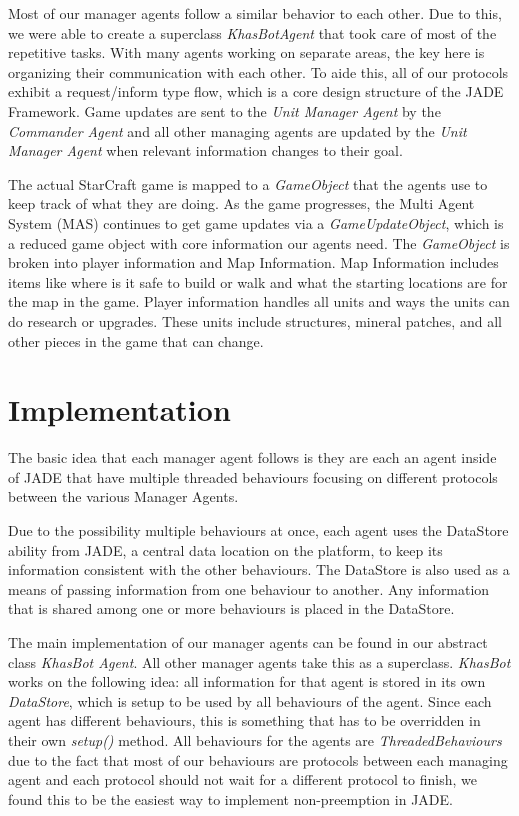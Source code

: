\documentclass[letterpaper]{article}
\begin{document}
Most of our manager agents follow a similar behavior to each other. Due to this, we were able to create a superclass \emph{KhasBotAgent} that took care of most of the repetitive tasks.  With many agents working on separate areas, the key here is organizing their communication with each other.  To aide this, all of our protocols exhibit a request/inform type flow, which is a core design structure of the JADE Framework.  Game updates are sent to the \emph{Unit Manager Agent} by the \emph{Commander Agent} and all other managing agents are updated by the \emph{Unit Manager Agent} when relevant information changes to their goal.

The actual StarCraft game is mapped to a \emph{GameObject} that the agents use to keep track of what they are doing.  As the game progresses, the Multi Agent System (MAS) continues to get game updates via a \emph{GameUpdateObject}, which is a reduced game object with core information our agents need.  The \emph{GameObject} is broken into player information and Map Information. Map Information includes items like where is it safe to build or walk and what the starting locations are for the map in the game.  Player information handles all units and ways the units can do research or upgrades.  These units include structures, mineral patches, and all other pieces in the game that can change.

\section{Implementation}
The basic idea that each manager agent follows is they are each an agent inside of JADE that have multiple threaded 
behaviours focusing on different protocols between the various Manager Agents.

Due to the possibility multiple behaviours at once, each agent uses the DataStore ability from JADE, a central 
data location on the platform, to keep its information consistent with the other behaviours. The DataStore is also
used as a means of passing information from one behaviour to another. Any information that is shared among one or
more behaviours is placed in the DataStore.

The main implementation of our manager agents can be found in our abstract class \emph{KhasBot Agent}. All other 
manager agents take this as a superclass. \emph{KhasBot} works on the following idea: all information for that agent 
is stored in its own \emph{DataStore}, which is setup to be used by all behaviours of the agent. Since each agent 
has different behaviours, this is something that has to be overridden in their own \emph{setup()} method. All 
behaviours for the agents are \emph{ThreadedBehaviours} due to the fact that most of our behaviours are protocols 
between each managing agent and each protocol should not wait for a different protocol to finish, we found this to 
be the easiest way to implement non-preemption in JADE.
\end{document}
